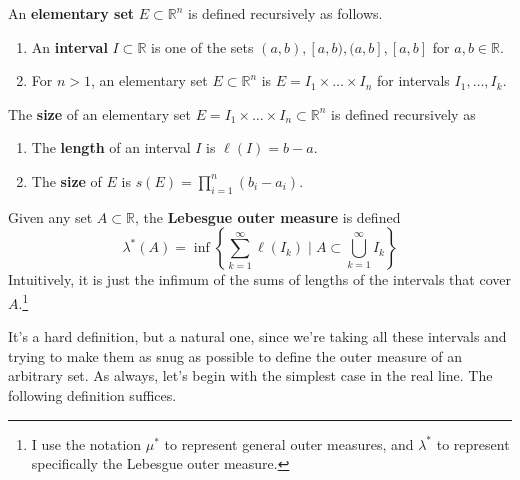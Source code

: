   \begin{definition} 
    An \textbf{elementary set} $E \subset \mathbb{R}^n$ is defined recursively as follows. 
    \begin{enumerate}
      \item An \textbf{interval} $I \subset \mathbb{R}$ is one of the sets $(a, b), [a, b), (a, b], [a, b]$ for $a, b \in \mathbb{R}$. 
      \item For $n > 1$, an elementary set $E \subset \mathbb{R}^n$ is $E = I_1 \times \ldots \times I_n$ for intervals $I_1, \ldots, I_k$. 
    \end{enumerate}
  \end{definition}

  \begin{definition}[Size]
    The \textbf{size} of an elementary set $E = I_1 \times \ldots \times I_n \subset \mathbb{R}^n$ is defined recursively as 
    \begin{enumerate}
      \item The \textbf{length} of an interval $I$ is $\ell(I) = b - a$. 
      \item The \textbf{size} of $E$ is $s(E) = \prod_{i=1}^n (b_i - a_i)$. 
    \end{enumerate}
  \end{definition} 

  \begin{definition}
    Given any set $A \subset \mathbb{R}$, the \textbf{Lebesgue outer measure} is defined 
    \begin{equation}
      \lambda^\ast (A) = \inf  \left\{ \sum_{k=1}^\infty \ell (I_k) \; \bigg| \; A \subset \bigcup_{k=1}^\infty I_k \right\} 
    \end{equation}
    Intuitively, it is just the infimum of the sums of lengths of the intervals that cover $A$.\footnote{I use the notation $\mu^\ast$ to represent general outer measures, and $\lambda^\ast$ to represent specifically the Lebesgue outer measure.} 
  \end{definition} 

  It's a hard definition, but a natural one, since we're taking all these intervals and trying to make them as snug as possible to define the outer measure of an arbitrary set. As always, let's begin with the simplest case in the real line. The following definition suffices. 

